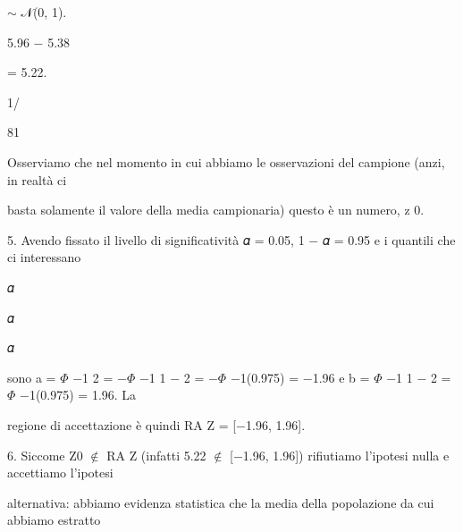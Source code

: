 \documentclass[a4paper,portrait,12pt]{article}
\begin{document}
\begin{flushleft}
$\sim$ 𝒩(0, 1).
\end{flushleft}


5.96 $-$ 5.38


= 5.22.


1/


81





\begin{flushleft}
Osserviamo che nel momento in cui abbiamo le osservazioni del campione (anzi, in realt\`{a} ci
\end{flushleft}


\begin{flushleft}
basta solamente il valore della media campionaria) questo \`{e} un numero, z 0.
\end{flushleft}


\begin{flushleft}
5. Avendo fissato il livello di significativit\`{a} 𝛼 = 0.05, 1 $-$ 𝛼 = 0.95 e i quantili che ci interessano
\end{flushleft}


\begin{flushleft}
𝛼
\end{flushleft}


\begin{flushleft}
𝛼
\end{flushleft}


\begin{flushleft}
𝛼
\end{flushleft}


\begin{flushleft}
sono a = $\Phi$ $-$1 2 = $-$$\Phi$ $-$1 1 $-$ 2 = $-$$\Phi$ $-$1(0.975) = $-$1.96 e b = $\Phi$ $-$1 1 $-$ 2 = $\Phi$ $-$1(0.975) = 1.96. La
\end{flushleft}


\begin{flushleft}
regione di accettazione \`{e} quindi RA Z = [$-$1.96, 1.96].
\end{flushleft}


\begin{flushleft}
6. Siccome Z0 $\notin$ RA Z (infatti 5.22 $\notin$ [$-$1.96, 1.96]) rifiutiamo l'ipotesi nulla e accettiamo l'ipotesi
\end{flushleft}


\begin{flushleft}
alternativa: abbiamo evidenza statistica che la media della popolazione da cui abbiamo estratto
\end{flushleft}
\end{document}
